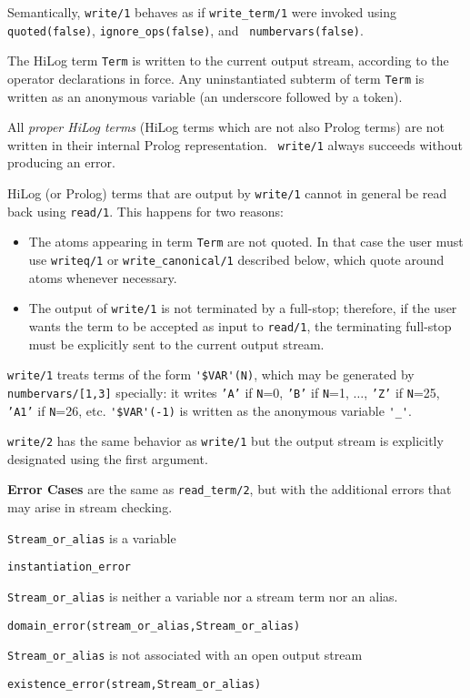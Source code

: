 \begin{description}
% 
Semantically, {\tt write/1} behaves as if {\tt write\_term/1} were
invoked using {\tt quoted(false)}, {\tt ignore\_ops(false)}, and {\tt
  numbervars(false)}.

The HiLog term {\tt Term} is written to the current output stream,
according to the operator declarations in force.  Any uninstantiated
subterm of term {\tt Term} is written as an anonymous variable (an
underscore followed by a token).  

All {\em proper HiLog terms} (HiLog terms which are not also Prolog
terms) are not written in their internal Prolog representation.  {\tt
  write/1} always succeeds without producing an error.

HiLog (or Prolog) terms that are output by {\tt write/1} cannot in
general be read back using {\tt read/1}.  This happens for two
reasons:
    \begin{itemize}
    \item The atoms appearing in term {\tt Term} are not quoted. In that case 
          the user must use {\tt writeq/1} or 
          {\tt write\_canonical/1} described below, which quote around atoms 
          whenever necessary.
    \item The output of {\tt write/1} is not terminated by a full-stop;
          therefore, if the user wants the term to be accepted as input to
          {\tt read/1}, the terminating full-stop must be explicitly sent 
          to the current output stream. 
    \end{itemize}

{\tt write/1} treats terms of the form \verb|'$VAR'(N)|, which may be
generated by {\tt numbervars/[1,3]} specially: it writes {\tt 'A'} if
{\tt N}=0, {\tt 'B'} if {\tt N}=1, $\ldots$, {\tt 'Z'} if {\tt N}=25,
{\tt 'A1'} if {\tt N}=26, etc.  \verb|'$VAR'(-1)| is written as the
anonymous variable \verb|'_'|.

	{\tt write/2} has the same behavior as {\tt write/1} but the
	output stream is explicitly designated using the first argument.

{\bf Error Cases} are the same as {\tt read\_term/2}, but with the
additional errors that may arise in stream checking.
\bi
\item 	{\tt Stream\_or\_alias} is a variable
\bi
\item {\tt instantiation\_error}
\ei
\item 	{\tt Stream\_or\_alias} is neither a variable nor a stream term nor an alias.
\bi
\item 	{\tt domain\_error(stream\_or\_alias,Stream\_or\_alias)}
\ei
\item 	{\tt Stream\_or\_alias} is not associated with an open output stream
\bi
\item 	{\tt existence\_error(stream,Stream\_or\_alias)}
\ei
\ei


\end{description}
